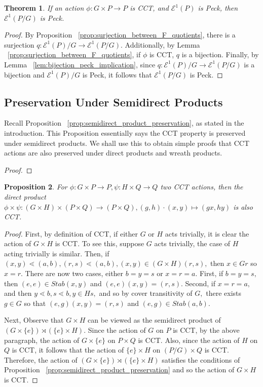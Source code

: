 \documentclass[10 pt]{amsart}
\theoremstyle{plain}
\newtheorem{thm}{Theorem}[section]
\newtheorem{prop}[thm]{Proposition}
\theoremstyle{definition}
\theoremstyle{remark}
\numberwithin{equation}{section}
\newcommand\ssec{\subsection}
\begin{document}
\begin{thm}
If an action $\phi:G \times P \rightarrow P$ is CCT, and $\mathcal E^1(P)$ is Peck, then $\mathcal E^1(P/G)$ is Peck.
\end{thm}
\begin{proof}
By Proposition ~\ref{prop:surjection_between_F_quotients}, there is a surjection $q:\mathcal E^1(P)/G \rightarrow \mathcal E^1(P/G).$ Additionally, by Lemma ~\ref{prop:surjection_between_F_quotients}, if $\phi$ is CCT, $q$ is a bijection. Finally, by Lemma ~\ref{lem:bijection_peck_implication}, since $q:\mathcal E^1(P)/G \rightarrow \mathcal E^1(P/G)$ is a bijection and $\mathcal E^1(P)/G$ is Peck, it follows that $\mathcal E^1(P/G)$ is Peck.
\end{proof}


\ssec{Preservation Under Semidirect Products}
\label{ssec:semidirect_product_preservation}
Recall Proposition ~\ref{prop:semidirect_product_preservation}, as stated in the introduction. This Proposition essentially says the CCT property is preserved under semidirect products. We shall use this to obtain simple proofs that CCT actions are also preserved under direct products and wreath products.

\semidirect*

\begin{proof}

\end{proof}

\begin{prop}
\label{prop:direct_product_preservation}
For $\phi:G\times P\rightarrow P,\psi:H \times Q \rightarrow Q$ two CCT actions, then the direct product $\phi \times \psi:(G\times H)\times (P\times Q) \rightarrow (P\times Q),(g,h)\cdot (x,y) \mapsto (gx,hy)$ is also CCT.
\end{prop}
\begin{proof}
First, by definition of CCT, if either $G$ or $H$ acts trivially, it is clear the action of $G\times H$ is CCT. To see this, suppose $G$ acts trivially, the case of $H$ acting trivially is similar. Then, if $(x,y) \lessdot (a,b),(r,s)\lessdot (a,b),(x,y) \in (G\times H)(r,s),$ then $x \in Gr$ so $x = r.$ There are now two cases, either $b = y = s$ or $x = r = a.$ First, if $b = y = s,$ then $(e,e) \in Stab(x,y)$ and $(e,e)(x,y) = (r,s).$ Second, if $x = r = a,$ and then $y \lessdot b,s \lessdot b,y \in Hs,$ and so by cover transitivity of $G,$ there exists $g \in G$ so that $(e,g)(x,y) = (r,s)$ and $(e,g) \in Stab(a,b).$

Next, Observe that $G \times H$ can be viewed as the semidirect product of $(G\times \{e\}) \rtimes (\{e\} \times H).$ Since the action of $G$ on $P$ is CCT, by the above paragraph, the action of $G\times \{e\}$ on $P \times Q$ is CCT. Also, since the action of $H$ on $Q$ is CCT, it follows that the action of $\{e\}\times H$ on $(P/G) \times Q$ is CCT. Therefore, the action of $(G\times \{e\}) \rtimes (\{e\} \times H)$ satisfies the conditions of Proposition ~\ref{prop:semidirect_product_preservation} and so the action of $G\times H$ is CCT.
\end{proof}
\end{document}
